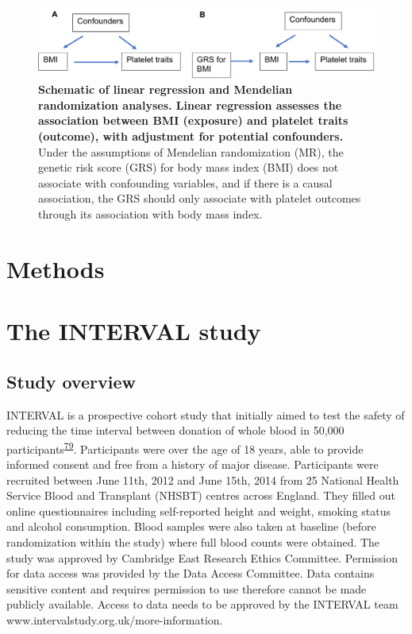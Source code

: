 \documentclass[11pt,twoside]{bristolthesis}
\begin{document}
\begin{figure}
\includegraphics[width=0.8\linewidth]{figure/BMI_platelets/obsvMRexample} \caption[Schematic of linear regression and Mendelian randomization frameworks for BMI and platelet trait analyses]{\textbf{Schematic of linear regression and Mendelian randomization analyses. Linear regression assesses the association between BMI (exposure) and platelet traits (outcome), with adjustment for potential confounders.} Under the assumptions of Mendelian randomization (MR), the genetic risk score (GRS) for body mass index (BMI) does not associate with confounding variables, and if there is a causal association, the GRS should only associate with platelet outcomes through its association with body mass index.}\label{fig:Linear-reg-MR}
\end{figure}
\hypertarget{methods}{%
\section{Methods}\label{methods}}

\hypertarget{INTERVAL-study}{%
\section{The INTERVAL study}\label{INTERVAL-study}}

\hypertarget{study-overview}{%
\subsection{Study overview}\label{study-overview}}

INTERVAL is a prospective cohort study that initially aimed to test the safety of reducing the time interval between donation of whole blood in 50,000 participants\textsuperscript{\protect\hyperlink{ref-DiAngelantonio2017}{79}}. Participants were over the age of 18 years, able to provide informed consent and free from a history of major disease. Participants were recruited between June 11th, 2012 and June 15th, 2014 from 25 National Health Service Blood and Transplant (NHSBT) centres across England. They filled out online questionnaires including self-reported height and weight, smoking status and alcohol consumption. Blood samples were also taken at baseline (before randomization within the study) where full blood counts were obtained. The study was approved by Cambridge East Research Ethics Committee. Permission for data access was provided by the Data Access Committee. Data contains sensitive content and requires permission to use therefore cannot be made publicly available. Access to data needs to be approved by the INTERVAL team www.intervalstudy.org.uk/more-information.
\end{document}
